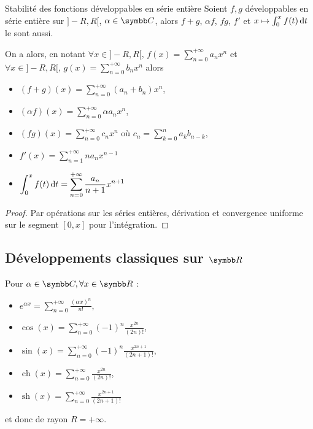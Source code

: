 \begin{proposition}{Stabilité des fonctions développables en série entière}{}
    Soient $f, g$ développables en série entière sur $]-R, R[$, $\alpha \in \C$, alors 
    $f + g$, $\alpha f$, $fg$, $f'$ et $x \mapsto \int_0^x f(t) \,\mathrm{d}t$ le sont aussi. 

\end{proposition}

On a alors, en notant $\displaystyle \forall x \in ]-R, R[, \, f(x) = \sum_{n = 0}^{+\infty} a_n x^n$ et
    $\displaystyle \forall x \in ]-R, R[, \, g(x) = \sum_{n = 0}^{+\infty} b_n x^n$ alors 
    
    \begin{itemize}
        \item $\displaystyle (f + g)(x) = \sum_{n = 0}^{+\infty} (a_n + b_n) x^n$, 
        \item $\displaystyle (\alpha f)(x) = \sum_{n = 0}^{+\infty} \alpha a_n x^n$,
        \item $\displaystyle (fg)(x) = \sum_{n = 0}^{+\infty} c_n x^n$ où $\displaystyle c_n = \sum_{k = 0}^n a_k b_{n - k}$,
        \item $\displaystyle f'(x) = \sum_{n = 1}^{+\infty} n a_n x^{n - 1}$
        \item $\displaystyle \int_0^x f(t) \,\mathrm{d}t = \sum_{n = 0}^{+\infty} \frac{a_n}{n + 1} x^{n + 1}$
    \end{itemize}

\begin{proof}
    Par opérations sur les séries entières, dérivation et convergence uniforme sur le segment 
    $[0, x]$ pour l'intégration.
\end{proof}


\subsection{Développements classiques sur \texorpdfstring{$\R$}{R} }

\begin{proposition}{}{}
    Pour $\alpha \in \C, \forall x \in \R$ : 
    \begin{itemize}
        \item $\displaystyle e^{\alpha x} = \sum_{n = 0}^{+\infty} \frac{(\alpha x)^n}{n!}$,
        \item $\displaystyle \cos(x) = \sum_{n = 0}^{+\infty} (-1)^n \frac{x^{2n}}{(2n)!}$,
        \item $\displaystyle \sin(x) = \sum_{n = 0}^{+\infty} (-1)^n \frac{x^{2n + 1}}{(2n + 1)!}$,
        \item $\displaystyle \operatorname{ch } (x) = \sum_{n = 0}^{+\infty} \frac{x^{2n}}{(2n)!}$,
        \item $\displaystyle \operatorname{sh } (x) = \sum_{n = 0}^{+\infty} \frac{x^{2n + 1}}{(2n + 1)!}$
    \end{itemize}
    et donc de rayon $R = + \infty$.
\end{proposition}



